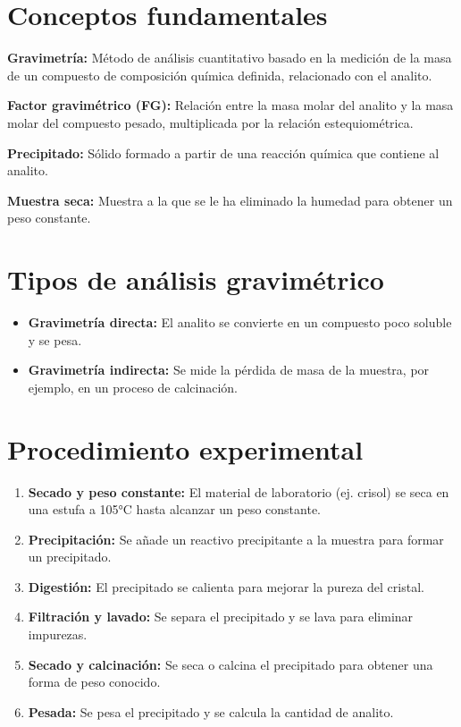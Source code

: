 \section{Conceptos fundamentales}


    \textbf{Gravimetría:} Método de análisis cuantitativo basado en la medición de la masa de un compuesto de composición química definida, relacionado con el analito.
    
    \textbf{Factor gravimétrico (FG):} Relación entre la masa molar del analito y la masa molar del compuesto pesado, multiplicada por la relación estequiométrica.
    
    \textbf{Precipitado:} Sólido formado a partir de una reacción química que contiene al analito.
    
    \textbf{Muestra seca:} Muestra a la que se le ha eliminado la humedad para obtener un peso constante.


\section{Tipos de análisis gravimétrico}
\begin{itemize}
    \item \textbf{Gravimetría directa:} El analito se convierte en un compuesto poco soluble y se pesa.
    \item \textbf{Gravimetría indirecta:} Se mide la pérdida de masa de la muestra, por ejemplo, en un proceso de calcinación.
\end{itemize}

\section{Procedimiento experimental}
\begin{enumerate}
    \item \textbf{Secado y peso constante:} El material de laboratorio (ej. crisol) se seca en una estufa a 105°C hasta alcanzar un peso constante.
    \item \textbf{Precipitación:} Se añade un reactivo precipitante a la muestra para formar un precipitado.
    \item \textbf{Digestión:} El precipitado se calienta para mejorar la pureza del cristal.
    \item \textbf{Filtración y lavado:} Se separa el precipitado y se lava para eliminar impurezas.
    \item \textbf{Secado y calcinación:} Se seca o calcina el precipitado para obtener una forma de peso conocido.
    \item \textbf{Pesada:} Se pesa el precipitado y se calcula la cantidad de analito.
\end{enumerate}

